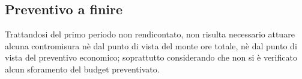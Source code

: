 		\subsection{Preventivo a finire}
			Trattandosi del primo periodo non rendicontato, non risulta necessario attuare alcuna contromisura nè dal punto di vista del monte ore totale, nè dal punto di vista del preventivo economico; soprattutto considerando che non si è verificato alcun sforamento del budget preventivato.
			
			
			
			